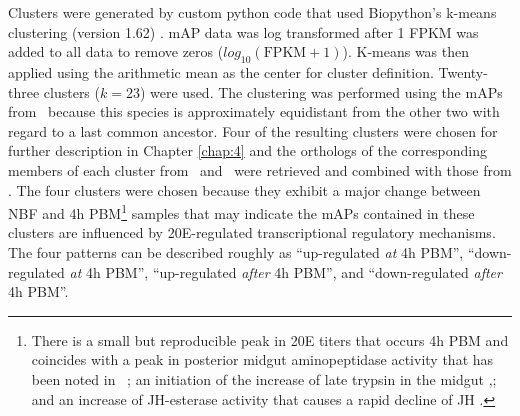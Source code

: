 Clusters were generated by custom python code that used Biopython's k-means clustering (version 1.62) \cite{Cock2009}.
\gls{mAP} data was log transformed after 1 FPKM was added to all data to remove zeros ($log_{10}(\mathrm{FPKM}+1)$). 
K-means was then applied using the arithmetic mean as the center for cluster definition.
Twenty-three clusters ($k = 23$) were used.
The clustering was performed using the \glspl{mAP} from \Ag\ because this species is approximately equidistant from the other two with regard to a last common ancestor.
Four of the resulting clusters were chosen for further description in Chapter \ref{chap:4} and the orthologs of the corresponding members of each cluster from \Aa\ and \Cq\ were retrieved and combined with those from \Ag.
The four clusters were chosen because they exhibit a major change between \gls{NBF} and 4h \gls{PBM}\footnote{There is a small but reproducible peak in \gls{20E} titers that occurs 4h \gls{PBM} \cite{Hagedorn1975} and coincides with a peak in posterior midgut aminopeptidase activity that has been noted in \As\ \cite{Billingsley1991}; an initiation of the increase of late trypsin in the midgut \cite{Barillasmury1991},\cite{Graf1988}; and an increase of JH-esterase activity that causes a rapid decline of \gls{JH} \cite{Shapiro1986}.} samples that may indicate the \glspl{mAP} contained in these clusters are influenced by \gls{20E}-regulated transcriptional regulatory mechanisms.
The four patterns can be described roughly as ``up-regulated \textit{at} 4h \gls{PBM}'', ``down-regulated \textit{at} 4h \gls{PBM}'', ``up-regulated \textit{after} 4h \gls{PBM}'', and ``down-regulated \textit{after} 4h \gls{PBM}''.




